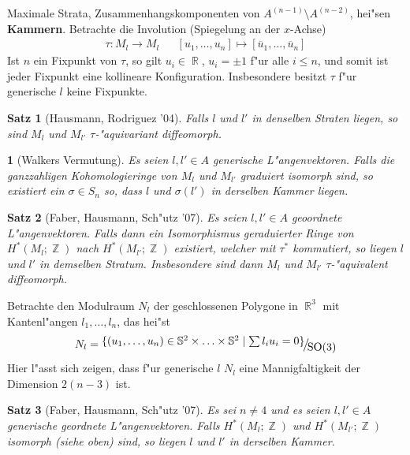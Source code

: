 \documentclass[paper=A4, twoside, chapterprefix=true, bibliography=totoc, headsepline]{scrbook}
\DeclareMathOperator{\R}{\mathbb{R}}
\DeclareMathOperator{\Z}{\mathbb{Z}}
\renewcommand{\S}{\mathbb{S}}
\DeclareMathOperator{\SO}{SO} %
\newcommand{\X}{\times}
\newcommand{\FakRaum}[2]{
	\raisebox{0.7ex}{\ensuremath{#1}}
	\ensuremath{\mkern-3mu}\big/\ensuremath{\mkern-3mu}
	\raisebox{-0.6ex}{\ensuremath{#2}}}
\theoremstyle{nonumberbreak}
\newtheorem{satz}{Satz}
\theoremstyle{emptybreak}
\newtheorem{emptythm}{}%
\theoremstyle{break}
\newcommand{\DefTerm}[2][]{\ifthenelse{\isempty{#1}}{\index{#2}}{\index{#1}}#2}
\newcommand{\defi}[2][]{\textbf{\DefTerm[#1]{#2}}}
\begin{document}
Maximale Strata, Zusammenhangskomponenten von $A^{(n-1)} \setminus A^{(n-2)}$, hei"sen \defi[Kammer]{Kammern}.
Betrachte die Involution (Spiegelung an der $x$-Achse)
\begin{align*}
	\tau: M_l \to M_l && [u_1, \ldots, u_n] \mapsto [\overline{u}_1, \ldots, \overline{u}_n]
\end{align*}
Ist $n$ ein Fixpunkt von $\tau$, so gilt $u_i \in \R$, $u_i = \pm 1$ f"ur alle $i \le n$, und somit ist jeder Fixpunkt eine kollineare Konfiguration.
Insbesondere besitzt $\tau$ f"ur generische $l$ keine Fixpunkte.

\begin{satz}[Hausmann, Rodriguez '04]
Falls $l$ und $l'$ in denselben Straten liegen, so sind $M_l$ und $M_{l'}$ $\tau$-"aquivariant diffeomorph.
\end{satz}

\begin{emptythm}[Walkers Vermutung]
Es seien $l, l' \in A$ generische L"angenvektoren.
Falls die ganzzahligen Kohomologieringe von $M_l$ und $M_{l'}$ graduiert isomorph sind, so existiert ein $\sigma \in S_n$ so, dass $l$ und $\sigma(l')$ in derselben Kammer liegen.
\end{emptythm}

\begin{satz}[Faber, Hausmann, Sch"utz '07]
Es seien $l, l' \in A$ geoordnete L"angenvektoren.
Falls dann ein Isomorphismus geraduierter Ringe von $H^*(M_l; \Z)$ nach $H^*(M_{l'}; \Z)$ existiert, welcher mit $\tau^*$ kommutiert, so liegen $l$ und $l'$ in demselben Stratum.
Insbesondere sind dann $M_l$ und $M_{l'}$ $\tau$-"aquivalent diffeomorph.
\end{satz}

Betrachte den Modulraum $N_l$ der geschlossenen Polygone in $\R^3$ mit Kantenl"angen $l_1, \ldots, l_n$, das hei"st
\begin{align*}
	N_l = \FakRaum{\{(u_1, \ldots, u_n) \in \S^2 \X \ldots \X \S^2 \mid \sum l_i u_i = 0\}}{\SO(3)}
\end{align*}
Hier l"asst sich zeigen, dass f"ur generische $l$ $N_l$ eine Mannigfaltigkeit der Dimension $2 (n - 3)$ ist.

\begin{satz}[Faber, Hausmann, Sch"utz '07]
Es sei $n \ne 4$ und es seien $l, l' \in A$ generische geordnete L"angenvektoren.
Falls $H^*(M_l; \Z)$ und $H^*(M_{l'}; \Z)$ isomorph (siehe oben) sind, so liegen $l$ und $l'$ in derselben Kammer.
\end{satz}
\end{document}
